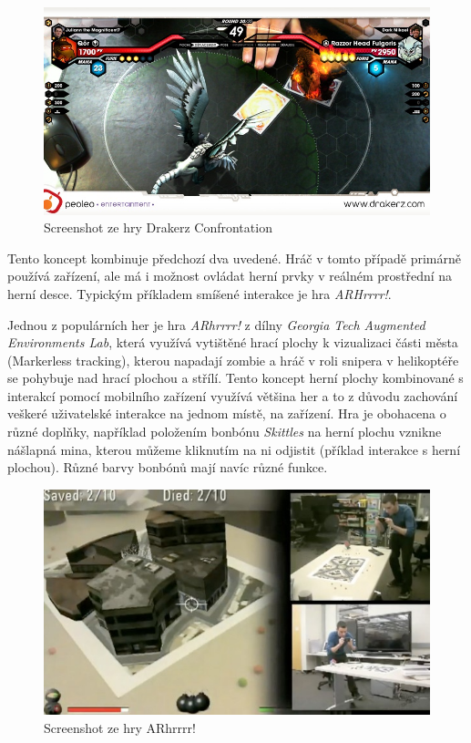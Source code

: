 \documentclass[twoside,12pt]{article}
\begin{document}
\begin{figure}[H]
    \includegraphics[width=424px, center]{images/drakerz-confrontation.jpg}
    \caption{Screenshot ze hry Drakerz Confrontation}
    \label{drakerz_screenshot}
\end{figure}

Tento koncept kombinuje předchozí dva uvedené. Hráč v tomto případě primárně používá zařízení, ale má i možnost ovládat herní prvky v reálném prostřední na herní desce. Typickým příkladem smíšené interakce je hra \textit{ARHrrrr!}.

% 
Jednou z populárních her je hra \textit{ARhrrrr!} z dílny \textit{Georgia Tech Augmented Environments Lab}, která využívá vytištěné hrací plochy k vizualizaci části města (Markerless tracking), kterou napadají zombie a hráč v roli snipera v helikoptéře se pohybuje nad hrací plochou a střílí. Tento koncept herní plochy kombinované s interakcí pomocí mobilního zařízení využívá většina her a to z důvodu zachování veškeré uživatelské interakce na jednom místě, na zařízení. Hra je obohacena o různé doplňky, například položením bonbónu \textit{Skittles} na herní plochu vznikne nášlapná mina, kterou můžeme kliknutím na ni odjistit (příklad interakce s herní plochou). Různé barvy bonbónů mají navíc různé funkce.

\begin{figure}[H]
    \includegraphics[width=424px, center]{images/arhrrrr.jpg}
    \caption{Screenshot ze hry ARhrrrr!}
    \label{arhrrrr_screenshot}
\end{figure}
\end{document}
